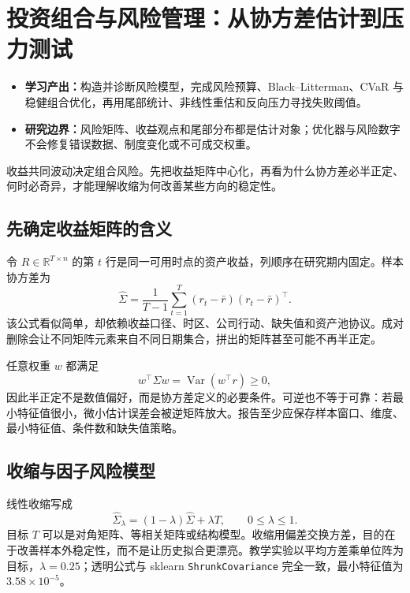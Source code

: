 \chapter{投资组合与风险管理：从协方差估计到压力测试}
\label{ch:lower-portfolio-estimation}

\begin{itemize}
  
  \item \textbf{学习产出：}构造并诊断风险模型，完成风险预算、Black--Litterman、CVaR 与稳健组合优化，再用尾部统计、非线性重估和反向压力寻找失败阈值。
  \item \textbf{研究边界：}风险矩阵、收益观点和尾部分布都是估计对象；优化器与风险数字不会修复错误数据、制度变化或不可成交权重。
\end{itemize}

收益共同波动决定组合风险。先把收益矩阵中心化，再看为什么协方差必半正定、何时必奇异，才能理解收缩为何改善某些方向的稳定性。


\section{先确定收益矩阵的含义}

令 $R\in\mathbb R^{T\times n}$ 的第 $t$ 行是同一可用时点的资产收益，列顺序在研究期内固定。样本协方差为
\[
 \widehat\Sigma=\frac{1}{T-1}\sum_{t=1}^{T}(r_t-\bar r)(r_t-\bar r)^\top.
\]
该公式看似简单，却依赖收益口径、时区、公司行动、缺失值和资产池协议。成对删除会让不同矩阵元素来自不同日期集合，拼出的矩阵甚至可能不再半正定。



任意权重 $w$ 都满足
\[
 w^\top\Sigma w=\operatorname{Var}(w^\top r)\ge0,
\]
因此半正定不是数值偏好，而是协方差定义的必要条件。可逆也不等于可靠：若最小特征值很小，微小估计误差会被逆矩阵放大。报告至少应保存样本窗口、维度、最小特征值、条件数和缺失值策略。

\section{收缩与因子风险模型}

线性收缩写成
\[
 \widehat\Sigma_\lambda=(1-\lambda)\widehat\Sigma+\lambda T,
 \qquad 0\le\lambda\le1.
\]
目标 $T$ 可以是对角矩阵、等相关矩阵或结构模型。收缩用偏差交换方差，目的在于改善样本外稳定性，而不是让历史拟合更漂亮。教学实验以平均方差乘单位阵为目标，$\lambda=0.25$；透明公式与 sklearn \texttt{ShrunkCovariance} 完全一致，最小特征值为 $3.58\times10^{-5}$\cite{ledoit2004well}。

